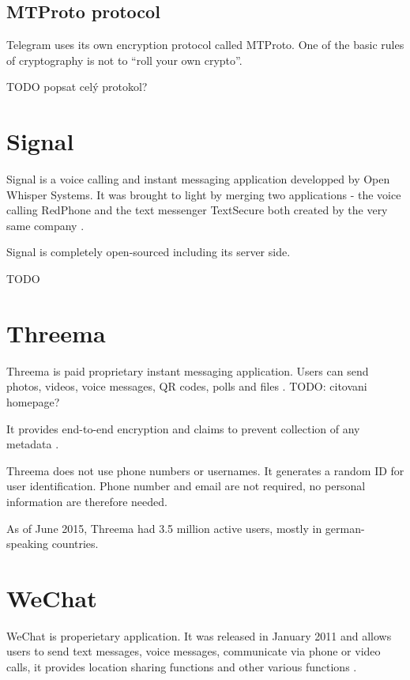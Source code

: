 \documentclass[thesis=M,english]{FITthesis}[2012/10/20]
\begin{document}
\subsection{MTProto protocol}

Telegram uses its own encryption protocol called MTProto. One of the basic rules of cryptography is not to ``roll your own crypto''.

TODO popsat celý protokol?


\section{Signal}

Signal is a voice calling and instant messaging application developped by Open Whisper Systems. It was brought to light by merging two applications - the voice calling RedPhone and the text messenger TextSecure both created by the very same company \cite{signalmerge}.

Signal is completely open-sourced including its server side.

TODO

\section{Threema}

Threema is paid proprietary instant messaging application. Users can send  photos, videos, voice messages, QR codes, polls and files \cite{threemahomepage}. TODO: citovani homepage?

It provides end-to-end encryption and claims to prevent collection of any metadata \cite{threemahomepage}.

Threema does not use phone numbers or usernames. It generates a random ID for user identification. Phone number and email are not required, no personal information are therefore needed.

As of June 2015, Threema had 3.5 million active users, mostly in german-speaking countries.\cite{threemausers}

\section{WeChat}

WeChat is properietary application. It was released in January 2011 and allows users to send text messages, voice messages, communicate via phone or video calls, it provides location sharing functions and other various functions \cite{wechatfeatures}.
\end{document}
